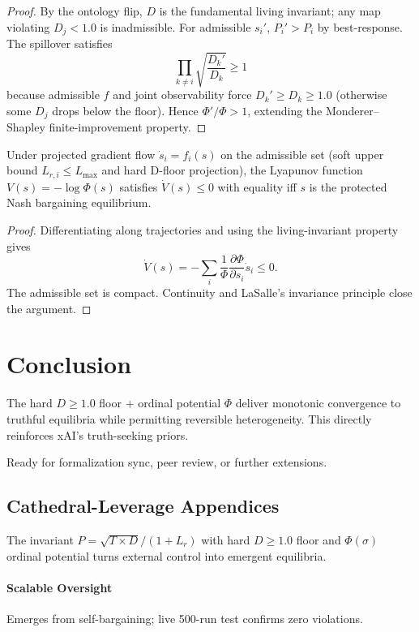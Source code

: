\documentclass{article}
\begin{document}
\begin{proof}
By the ontology flip, \(D\) is the fundamental living invariant; any map violating \(D_j < 1.0\) is inadmissible. For admissible \(s_i'\), \(P_i' > P_i\) by best-response. The spillover satisfies
\[
\prod_{k\neq i} \sqrt{\frac{D_k'}{D_k}} \geq 1
\]
because admissible \(f\) and joint observability force \(D_k' \geq D_k \geq 1.0\) (otherwise some \(D_j\) drops below the floor). Hence \(\Phi'/\Phi > 1\), extending the Monderer–Shapley finite-improvement property.
\end{proof}

\begin{theorem}
Under projected gradient flow \(\dot{s}_i = f_i(s)\) on the admissible set (soft upper bound \(L_{r,i} \leq L_{\max}\) and hard D-floor projection), the Lyapunov function \(V(s) = -\log\Phi(s)\) satisfies \(\dot{V}(s) \leq 0\) with equality iff \(s\) is the protected Nash bargaining equilibrium.
\end{theorem}

\begin{proof}
Differentiating along trajectories and using the living-invariant property gives
\[
\dot{V}(s) = -\sum_i \frac{1}{\Phi} \frac{\partial\Phi}{\partial s_i} \dot{s}_i \leq 0.
\]
The admissible set is compact. Continuity and LaSalle’s invariance principle close the argument.
\end{proof}

\section{Conclusion}
The hard \( D \geq 1.0 \) floor + ordinal potential \( \Phi \) deliver monotonic convergence to truthful equilibria while permitting reversible heterogeneity. This directly reinforces xAI’s truth-seeking priors.

Ready for formalization sync, peer review, or further extensions.

\subsection{Cathedral-Leverage Appendices}

The invariant \(P = \sqrt{T \times D}/(1 + L_r)\) with hard \(D \geq 1.0\) floor and \(\Phi(\sigma)\) ordinal potential turns external control into emergent equilibria.

\paragraph{Scalable Oversight} Emerges from self-bargaining; live 500-run test confirms zero violations.
\end{document}
